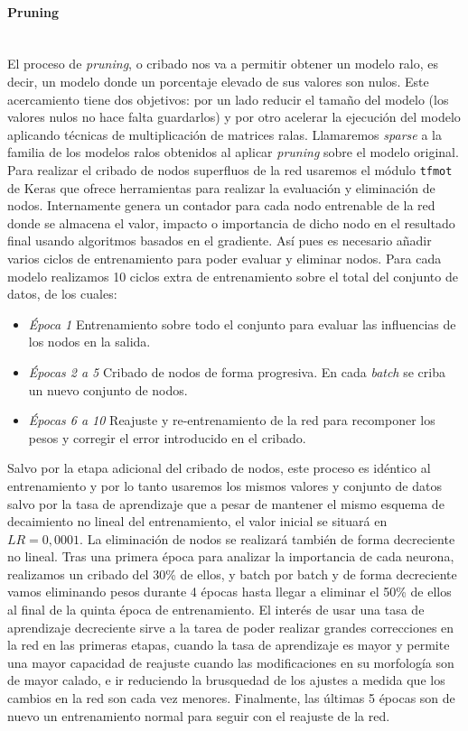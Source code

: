 \paragraph{Pruning}\\
El proceso de \textit{pruning}, o cribado nos va a permitir obtener un modelo ralo, es decir, un modelo donde un porcentaje elevado de sus valores son nulos. Este acercamiento tiene dos objetivos: por un lado reducir el tamaño del modelo (los valores nulos no hace falta guardarlos) y por otro acelerar la ejecución del modelo aplicando técnicas de multiplicación de matrices ralas. Llamaremos \textit{sparse} a la familia de los modelos ralos obtenidos al aplicar \textit{pruning} sobre el modelo original. Para realizar el cribado de nodos superfluos de la red usaremos el módulo \texttt{tfmot} de Keras que ofrece herramientas para realizar la evaluación y eliminación de nodos. Internamente genera un contador para cada nodo entrenable de la red donde se almacena el valor, impacto o importancia de dicho nodo en el resultado final usando algoritmos basados en el gradiente. Así pues es necesario añadir varios ciclos de entrenamiento para poder evaluar y eliminar nodos. Para cada modelo realizamos 10 ciclos extra de entrenamiento sobre el total del conjunto de datos, de los cuales:
\begin{itemize}
  \item \textsl{Época 1} Entrenamiento sobre todo el conjunto para evaluar las influencias de los nodos en la salida.
  \item \textsl{Épocas 2 a 5} Cribado de nodos de forma progresiva. En cada \textit{batch} se criba un nuevo conjunto de nodos.
  \item \textsl{Épocas 6 a 10} Reajuste y re-entrenamiento de la red para recomponer los pesos y corregir el error introducido en el cribado.
\end{itemize}

Salvo por la etapa adicional del cribado de nodos, este proceso es idéntico al entrenamiento y por lo tanto usaremos los mismos valores y conjunto de datos salvo por la tasa de aprendizaje que a pesar de mantener el mismo esquema de decaimiento no lineal del entrenamiento, el valor inicial se situará en $LR=0,0001$. La eliminación de nodos se realizará también de forma decreciente no lineal. Tras una primera época para analizar la importancia de cada neurona, realizamos un cribado del 30\% de ellos, y batch por batch y de forma decreciente vamos eliminando pesos durante 4 épocas hasta llegar a eliminar el 50\% de ellos al final de la quinta época de entrenamiento. El interés de usar una tasa de aprendizaje decreciente sirve a la tarea de poder realizar grandes correcciones en la red en las primeras etapas, cuando la tasa de aprendizaje es mayor y permite una mayor capacidad de reajuste cuando las modificaciones en su morfología son de mayor calado,  e ir reduciendo la brusquedad de los ajustes a medida que los cambios en la red son cada vez menores. Finalmente, las últimas 5 épocas son de nuevo un entrenamiento normal para seguir con el reajuste de la red. 

